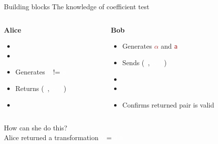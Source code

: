 \documentclass[dvipsnames]{beamer}
\newcommand{\priv}[1]{\textcolor{brown}{\texttt{#1}}}
\newcommand{\enc}[1]{\colorbox{SkyBlue!75}{\textcolor{white}{\texttt{#1}}}}
\begin{document}
    \begin{frame}{Building blocks}
        The knowledge of coefficient test
        \vspace{0.5cm}

        \begin{columns}
            \begin{column}{0.4\textwidth}
                \textbf{Alice}
                \begin{itemize}
                    \item[]
                    \item[]
                    \item Generates \enc{X} != \enc{a}
                    \item Returns (\enc{X}, \enc{$\alpha \cdot$X})
                    \item[]
                \end{itemize}
            \end{column}
            \begin{column}{0.6\textwidth}
                \textbf{Bob}
                \begin{itemize}
                    \item Generates \priv{$\alpha$} and \priv{a}
                    \item Sends (\enc{a}, \enc{$\alpha \cdot$a})
                    \item[]
                    \item[]
                    \item Confirms returned pair is valid
                \end{itemize}
            \end{column}
        \end{columns}
        \begin{center}
            How can she do this?\\
            \pause
            Alice returned a transformation \enc{X} = \enc{d$\cdot$a}
        \end{center}
    \end{frame}
\end{document}
